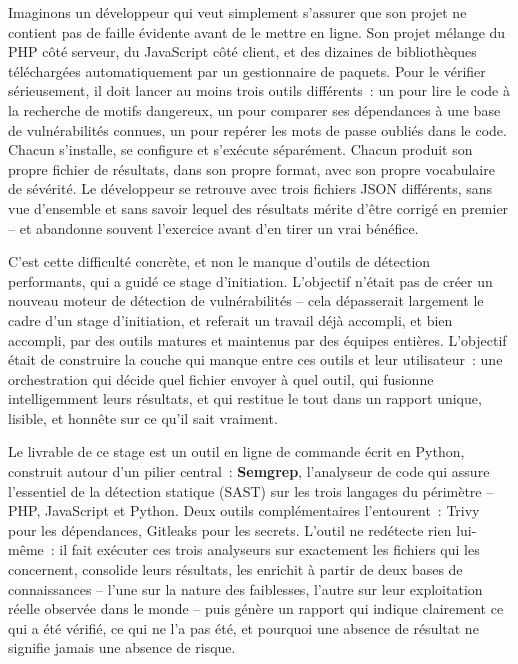 \documentclass[12pt,a4paper,oneside]{report}
\begin{document}

Imaginons un d\'eveloppeur qui veut simplement s'assurer que son projet ne contient pas de faille \'evidente avant de le mettre en ligne. Son projet m\'elange du PHP c\^ot\'e serveur, du JavaScript c\^ot\'e client, et des dizaines de biblioth\`eques t\'el\'echarg\'ees automatiquement par un gestionnaire de paquets. Pour le v\'erifier s\'erieusement, il doit lancer au moins trois outils diff\'erents~: un pour lire le code \`a la recherche de motifs dangereux, un pour comparer ses d\'ependances \`a une base de vuln\'erabilit\'es connues, un pour rep\'erer les mots de passe oubli\'es dans le code. Chacun s'installe, se configure et s'ex\'ecute s\'epar\'ement. Chacun produit son propre fichier de r\'esultats, dans son propre format, avec son propre vocabulaire de s\'ev\'erit\'e. Le d\'eveloppeur se retrouve avec trois fichiers JSON diff\'erents, sans vue d'ensemble et sans savoir lequel des r\'esultats m\'erite d'\^etre corrig\'e en premier -- et abandonne souvent l'exercice avant d'en tirer un vrai b\'en\'efice.

C'est cette difficult\'e concr\`ete, et non le manque d'outils de d\'etection performants, qui a guid\'e ce stage d'initiation. L'objectif n'\'etait pas de cr\'eer un nouveau moteur de d\'etection de vuln\'erabilit\'es -- cela d\'epasserait largement le cadre d'un stage d'initiation, et referait un travail d\'ej\`a accompli, et bien accompli, par des outils matures et maintenus par des \'equipes enti\`eres. L'objectif \'etait de construire la couche qui manque entre ces outils et leur utilisateur~: une orchestration qui d\'ecide quel fichier envoyer \`a quel outil, qui fusionne intelligemment leurs r\'esultats, et qui restitue le tout dans un rapport unique, lisible, et honn\^ete sur ce qu'il sait vraiment.

Le livrable de ce stage est un outil en ligne de commande \'ecrit en Python, construit autour d'un pilier central~: \textbf{Semgrep}, l'analyseur de code qui assure l'essentiel de la d\'etection statique (SAST) sur les trois langages du p\'erim\`etre -- PHP, JavaScript et Python. Deux outils compl\'ementaires l'entourent~: Trivy pour les d\'ependances, Gitleaks pour les secrets. L'outil ne red\'etecte rien lui-m\^eme~: il fait ex\'ecuter ces trois analyseurs sur exactement les fichiers qui les concernent, consolide leurs r\'esultats, les enrichit \`a partir de deux bases de connaissances -- l'une sur la nature des faiblesses, l'autre sur leur exploitation r\'eelle observ\'ee dans le monde -- puis g\'en\`ere un rapport qui indique clairement ce qui a \'et\'e v\'erifi\'e, ce qui ne l'a pas \'et\'e, et pourquoi une absence de r\'esultat ne signifie jamais une absence de risque.
\end{document}
